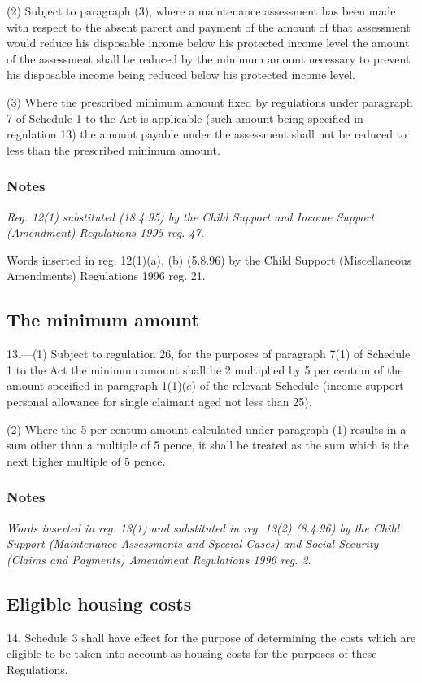 \documentclass[a4paper]{article}
\newcommand\amendment[1]{\subsubsection*{Notes}{\itshape\frenchspacing\footnotesize #1 \par\goodbreak}}
\begin{document}
(2) Subject to paragraph (3), where a maintenance assessment has been made with respect to the absent parent and payment of the amount of that assessment would reduce his disposable income below his protected income level the amount of the assessment shall be reduced by the minimum amount necessary to prevent his disposable income being reduced below his protected income level.

(3) Where the prescribed minimum amount fixed by regulations under paragraph 7 of Schedule 1 to the Act is applicable (such amount being specified in regulation 13) the amount payable under the assessment shall not be reduced to less than the prescribed minimum amount.

\amendment{
Reg. 12(1) substituted (18.4.95) by the Child Support and Income Support (Amendment) Regulations 1995 reg. 47.

Words inserted in reg. 12(1)(a), (b) (5.8.96) by the Child Support (Miscellaneous Amendments) Regulations 1996 reg. 21.
}

\subsection[13. The minimum amount]{The minimum amount}

13.—(1) Subject to regulation 26, for the purposes of paragraph 7(1) of Schedule 1 to the Act the minimum amount shall be 
2 multiplied by  %
5 per centum of the amount specified in paragraph 1(1)($e$) of the relevant Schedule (income support personal allowance for single claimant aged not less than 25).

(2) Where 
the 5 per centum amount  %
calculated under paragraph (1) results in a sum other than a multiple of 5 pence, it shall be treated as the sum which is the next higher multiple of 5 pence.

\amendment{
Words inserted in reg. 13(1) and substituted in reg. 13(2) (8.4.96) by the Child Support (Maintenance Assessments and Special Cases) and Social Security (Claims and Payments) Amendment Regulations 1996 reg. 2.
}

\subsection[14. Eligible housing costs]{Eligible housing costs}

14.  Schedule 3 shall have effect for the purpose of determining the costs which are eligible to be taken into account as housing costs for the purposes of these Regulations.
\end{document}
